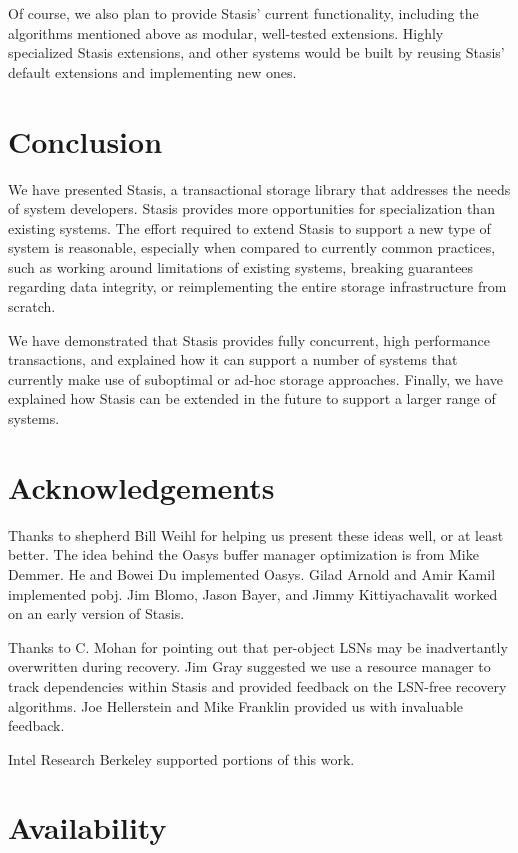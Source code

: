 \documentclass[letterpaper,twocolumn,10pt]{article}
\newcommand{\yad}{Stasis\xspace}
\newcommand{\yads}{Stasis'\xspace}
\newcommand{\oasys}{Oasys\xspace}
\begin{document}
Of course, we also plan to provide \yads current functionality, including the algorithms
mentioned above as modular, well-tested extensions.
Highly specialized \yad extensions, and other systems would be built
by reusing \yads default extensions and implementing new ones.


\section{Conclusion}

We have presented \yad, a transactional storage library that addresses
the needs of system developers.  \yad provides more opportunities for
specialization than existing systems.  The effort required to extend
\yad to support a new type of system is reasonable, especially when
compared to currently common practices, such as working around
limitations of existing systems, breaking guarantees regarding data
integrity, or reimplementing the entire storage infrastructure from
scratch.

We have demonstrated that \yad provides fully
concurrent, high performance transactions, and explained how it can
support a number of systems that currently make use of suboptimal or
ad-hoc storage approaches.  Finally, we have explained how \yad can be
extended in the future to support a larger range of systems.

\section{Acknowledgements}

Thanks to shepherd Bill Weihl for helping us present these ideas well,
or at least better. The idea behind the \oasys buffer manager
optimization is from Mike Demmer.  He and Bowei Du implemented \oasys.
Gilad Arnold and Amir Kamil implemented
 pobj.  Jim Blomo, Jason Bayer, and Jimmy
Kittiyachavalit worked on an early version of \yad.

Thanks to C. Mohan for pointing out that per-object LSNs may be
inadvertantly overwritten during recovery.  Jim Gray suggested we use
a resource manager to track dependencies within \yad and provided
feedback on the LSN-free recovery algorithms.  Joe Hellerstein and
Mike Franklin provided us with invaluable feedback.

Intel Research Berkeley supported portions of this work.

\section{Availability}
\label{sec:avail}
\end{document}
